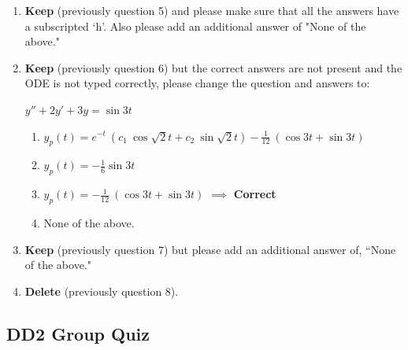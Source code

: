 \documentclass[fleqn]{article}[11pt]
\begin{document}
\begin{enumerate}
	\item \textbf{Keep} (previously question 5) and please make sure that all the answers have a subscripted `h'. Also please add an additional answer of "None of the above."
	
	\item \textbf{Keep} (previously question 6) but the correct answers are not present and the ODE is not typed correctly, please change the question and answers to:
	
	\(y''+2y'+3y=\sin{3t}\)
		\begin{enumerate}
			\item $y_{p}(t)=e^{-t}\ (c_1\ \cos{\sqrt{2}t}+c_2\ \sin{\sqrt{2}t})-\frac{1}{12}\ (\cos{3t}+\sin{3t})$
			\item $y_{p}(t)=-\frac{1}{6}\sin{3t}$
			\item $y_{p}(t)=-\frac{1}{12}\ (\cos{3t}+\sin{3t})$ $\implies$ \textbf{Correct}
			\item None of the above.
		\end{enumerate}
	
	\item \textbf{Keep} (previously question 7) but please add an additional answer of, ``None of the above."
	
	\item \textbf{Delete} (previously question 8).
\end{enumerate}

\subsection*{DD2 Group Quiz}
\end{document}
